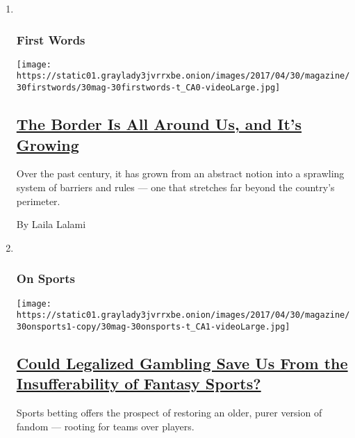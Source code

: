 \begin{enumerate}
\def\labelenumi{\arabic{enumi}.}
\item ~
  \hypertarget{first-words}{%
  \subsubsection{First Words}\label{first-words}}

  \texttt{[image: https://static01.graylady3jvrrxbe.onion/images/2017/04/30/magazine/30firstwords/30mag-30firstwords-t\_CA0-videoLarge.jpg]}

  \hypertarget{the-border-is-all-around-us-and-its-growing}{%
  \subsection{\texorpdfstring{\href{/2017/04/25/magazine/the-border-is-all-around-us-and-its-growing.html}{The
  Border Is All Around Us, and It's
  Growing}}{The Border Is All Around Us, and It's Growing}}\label{the-border-is-all-around-us-and-its-growing}}

  Over the past century, it has grown from an abstract notion into a
  sprawling system of barriers and rules --- one that stretches far
  beyond the country's perimeter.

  By Laila Lalami
\item ~
  \hypertarget{on-sports}{%
  \subsubsection{On Sports}\label{on-sports}}

  \texttt{[image: https://static01.graylady3jvrrxbe.onion/images/2017/04/30/magazine/30onsports1-copy/30mag-30onsports-t\_CA1-videoLarge.jpg]}

  \hypertarget{could-legalized-gambling-save-us-from-the-insufferability-of-fantasy-sports}{%
  \subsection{\texorpdfstring{\href{/2017/04/25/magazine/could-legalized-gambling-save-us-from-the-insufferability-of-fantasy-sports.html}{Could
  Legalized Gambling Save Us From the Insufferability of Fantasy
  Sports?}}{Could Legalized Gambling Save Us From the Insufferability of Fantasy Sports?}}\label{could-legalized-gambling-save-us-from-the-insufferability-of-fantasy-sports}}

  Sports betting offers the prospect of restoring an older, purer
  version of fandom --- rooting for teams over players.


\end{enumerate}
